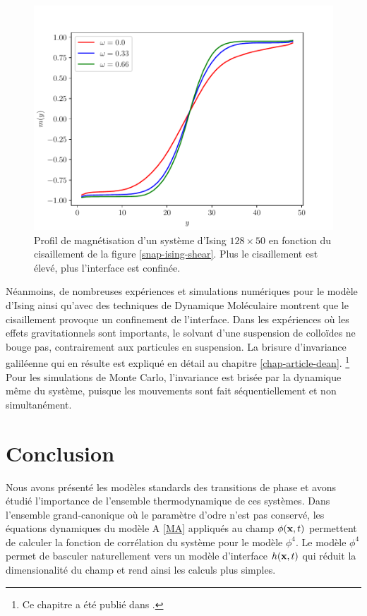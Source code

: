 \begin{figure}
    \centering
    \includegraphics[width=0.6\linewidth]{intro/profil-mag-ising-shear.pdf}
    \caption{Profil de magnétisation d'un système d'Ising $128 \times 50$ en fonction du cisaillement de la figure \ref{snap-ising-shear}. Plus le cisaillement est élevé, plus l'interface est confinée.}
    \label{profil-mag-ising-shear}
\end{figure}

Néanmoins, de nombreuses expériences\cite{derks_suppression_2006} et simulations numériques pour le modèle d'Ising \cite{leung_field_1986,rikvold_microstructure_2002,gonnella_nonequilibrium_2009,smith_driven_2010,smith_interfaces_2008,sadhu_non-local_2014,cohen_interface_2016,cirillo_monte_2005} ainsi qu'avec des techniques de Dynamique Moléculaire \cite{berthier_nonequilibrium_2002} montrent que le cisaillement provoque un confinement de l'interface. Dans les expériences où les effets gravitationnels sont importants, le solvant d'une suspension de colloïdes ne bouge pas, contrairement aux particules en suspension. La brisure d'invariance galiléenne qui en résulte est expliqué en détail au chapitre \ref{chap-article-dean}. \footnote{Ce chapitre a été publié dans \cite{dean_effect_2020}.}
Pour les simulations de Monte Carlo, l'invariance est brisée par la dynamique même du système, puisque les mouvements sont fait séquentiellement et non simultanément.

\section{Conclusion}

Nous avons présenté les modèles standards des transitions de phase et avons étudié l'importance de l'ensemble thermodynamique de ces systèmes.
Dans l'ensemble grand-canonique où le paramètre d'odre n'est pas conservé, les équations dynamiques du modèle A \ref{MA} appliqués au champ $\phi({\bf x},t)$ permettent de calculer la fonction de corrélation du système pour le modèle $\phi^4$. Le modèle $\phi^4$ permet de basculer naturellement vers un modèle d'interface $h({\bf x},t)$ qui réduit la dimensionalité du champ et rend ainsi les calculs plus simples.

